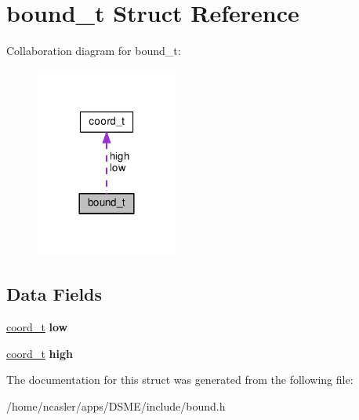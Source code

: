 \hypertarget{structbound__t}{}\section{bound\+\_\+t Struct Reference}
\label{structbound__t}


Collaboration diagram for bound\+\_\+t\+:\nopagebreak
\begin{figure}[H]
\begin{center}
\leavevmode
\includegraphics[width=132pt]{d0/d09/structbound__t__coll__graph}
\end{center}
\end{figure}
\subsection*{Data Fields}
\begin{DoxyCompactItemize}
\item 
\hypertarget{structbound__t_a1ed22ec59e044bdee317909ffbe40b59}{}\hyperlink{structcoord__t}{coord\+\_\+t} {\bfseries low}\label{structbound__t_a1ed22ec59e044bdee317909ffbe40b59}

\item 
\hypertarget{structbound__t_afe44f968321b3f4af4db338935a14b1f}{}\hyperlink{structcoord__t}{coord\+\_\+t} {\bfseries high}\label{structbound__t_afe44f968321b3f4af4db338935a14b1f}

\end{DoxyCompactItemize}


The documentation for this struct was generated from the following file\+:\begin{DoxyCompactItemize}
\item 
/home/ncasler/apps/\+D\+S\+M\+E/include/bound.\+h\end{DoxyCompactItemize}
